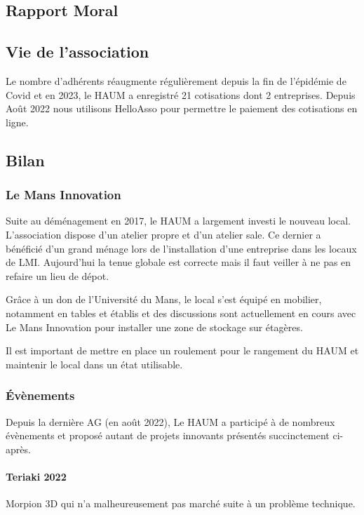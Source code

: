 \documentclass[a4paper, 11pt]{article}
\begin{document}
\clearpage
\begin{appendices}
\section{Rapport Moral}

\subsection{Vie de l'association}

Le nombre d'adhérents réaugmente régulièrement depuis la fin de l'épidémie de Covid et en
2023, le HAUM a enregistré 21 cotisations dont 2 entreprises.
Depuis Août 2022 nous utilisons HelloAsso pour permettre le paiement des cotisations en ligne.

\subsection{Bilan}

\subsubsection{Le Mans Innovation}

Suite au déménagement en 2017, le HAUM a largement investi le nouveau local. L'association dispose d'un atelier propre et d'un atelier sale. Ce dernier a bénéficié d'un grand ménage lors de l'installation d'une entreprise dans les locaux de LMI. Aujourd'hui la tenue globale est correcte mais il faut veiller à ne pas en refaire un lieu de dépot. 

Grâce à un don de l'Université du Mans, le local s'est équipé en mobilier, notamment en tables et établis et des discussions sont actuellement en cours avec Le Mans Innovation pour installer une zone de stockage sur étagères. 

Il est important de mettre en place un roulement pour le rangement du HAUM et maintenir le local dans un état utilisable.

\subsubsection{Évènements}

Depuis la dernière AG (en août 2022), Le HAUM a participé à de nombreux évènements et proposé autant de
projets innovants présentés succinctement ci-après.

\paragraph{Teriaki 2022} Morpion 3D qui n'a malheureusement pas marché suite à un problème technique.


\end{appendices}
\end{document}

